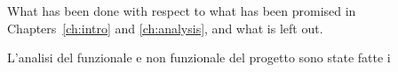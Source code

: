 What has been done with respect to what has been promised
in Chapters~\ref{ch:intro} and \ref{ch:analysis},
and what is left out.

L'analisi del funzionale e non funzionale del progetto sono state
fatte i